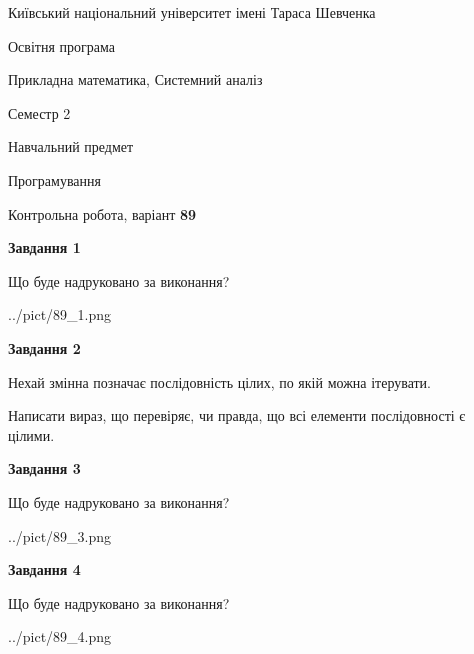 \documentclass[12pt, ukrainian]{article}
\begin{document}
{{\begin {small}\par
{ \center  Київський національний університет імені Тараса Шевченка \par}
{\parbox {5 cm}{Освітня програма \hfill}{\parbox {8 cm}{Прикладна математика, Системний аналіз \hfill}}\parbox {5 cm}{\hfill Семестр 2}}\par
{\parbox {5 cm} {Навчальний предмет \hfill}\parbox {7 cm}{Програмування \hfill}\parbox {6cm}{\hfill}\par}\vspace{-7pt} \end{small}}{\center Контрольна робота, варіант  \No \textbf
{ 89 }\par}}
{
\begin {large}
{\begin {center}\textbf{Завдання 1}\end {center}}\par
Що буде надруковано за виконання?\par\par
\begin{center}
	{../pict/89_1.png}
\end{center}
\newpage

{\begin {center}\textbf{Завдання 2}\end {center}}\par
Нехай змінна  позначає послідовність цілих, по якій можна ітерувати.

Написати вираз, що перевіряє, чи правда, що всі елементи послідовності є цілими.\par
\newpage

{\begin {center}\textbf{Завдання 3}\end {center}}\par
Що буде надруковано за виконання?\par
\begin{center}
	{../pict/89_3.png}
\end{center}
\newpage

{\begin {center}\textbf{Завдання 4}\end {center}}\par
Що буде надруковано за виконання?\par
\begin{center}
	{../pict/89_4.png}
\end{center}
\newpage


\end{large}}
\end{document}
